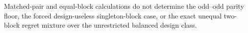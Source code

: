 Matched-pair and equal-block calculations do not determine the odd--odd parity floor, the forced design-useless singleton-block case, or the exact unequal two-block regret mixture over the unrestricted balanced design class.